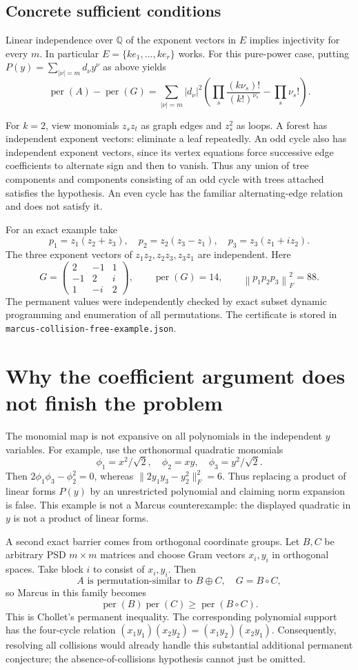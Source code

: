 \documentclass[11pt]{article}
\newcommand{\per}{\operatorname{per}}
\begin{document}
\subsection*{Concrete sufficient conditions}
Linear independence over $\mathbb Q$ of the exponent vectors in $E$ implies
injectivity for every $m$. In particular $E=\{k e_1,\ldots,k e_r\}$ works.
For this pure-power case, putting
$P(y)=\sum_{|\nu|=m}d_\nu y^\nu$ as above yields
\[
 \per(A)-\per(G)=\sum_{|\nu|=m}|d_\nu|^2
 \left(\prod_s\frac{(k\nu_s)!}{(k!)^{\nu_s}}-\prod_s\nu_s!\right).
\]

For $k=2$, view monomials $z_s z_t$ as graph edges and $z_s^2$ as loops.
A forest has independent exponent vectors: eliminate a leaf repeatedly.
An odd cycle also has independent exponent vectors, since its vertex equations
force successive edge coefficients to alternate sign and then to vanish.
Thus any union of tree components and components consisting of an odd cycle
with trees attached satisfies the hypothesis. An even cycle has the familiar
alternating-edge relation and does not satisfy it.

For an exact example take
\[
 p_1=z_1(z_2+z_3),\quad p_2=z_2(z_3-z_1),\quad
 p_3=z_3(z_1+i z_2).
\]
The three exponent vectors of $z_1z_2,z_2z_3,z_3z_1$ are independent. Here
\[
 G=\begin{pmatrix}2&-1&1\\-1&2&i\\1&-i&2\end{pmatrix},
 \qquad \per(G)=14,\qquad\left\|p_1p_2p_3\right\|_F^2=88.
\]
The permanent values were independently checked by exact subset dynamic
programming and enumeration of all permutations. The certificate is stored
in \texttt{marcus-collision-free-example.json}.

\section{Why the coefficient argument does not finish the problem}
The monomial map is not expansive on all polynomials in the independent $y$
variables. For example, use the orthonormal quadratic monomials
\[
 \phi_1=x^2/\sqrt2,\quad\phi_2=xy,\quad\phi_3=y^2/\sqrt2.
\]
Then $2\phi_1\phi_3-\phi_2^2=0$, whereas
$\|2y_1y_3-y_2^2\|_F^2=6$. Thus replacing a product of linear forms $P(y)$
by an unrestricted polynomial and claiming norm expansion is false.
This example is not a Marcus counterexample: the displayed quadratic in $y$
is not a product of linear forms.

A second exact barrier comes from orthogonal coordinate groups. Let $B,C$ be
arbitrary PSD $m\times m$ matrices and choose Gram vectors $x_i,y_i$ in
orthogonal spaces. Take block $i$ to consist of $x_i,y_i$. Then
\[
 A\text{ is permutation-similar to }B\oplus C,\quad
 G=B\circ C,
\]
so Marcus in this family becomes
\[
 \per(B)\per(C)\geq\per(B\circ C).
\]
This is Chollet's permanent inequality. The corresponding polynomial support
has the four-cycle relation
$(x_1y_1)(x_2y_2)=(x_1y_2)(x_2y_1)$. Consequently, resolving all collisions
would already handle this substantial additional permanent conjecture; the
absence-of-collisions hypothesis cannot just be omitted.
\end{document}
